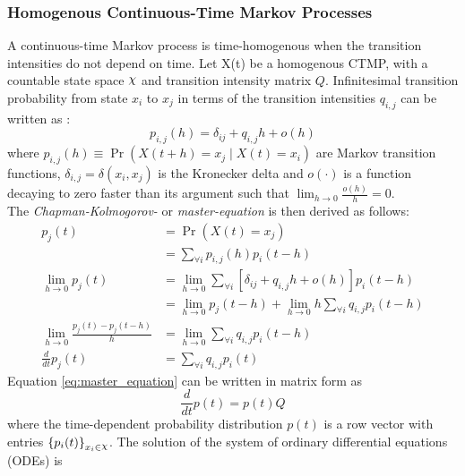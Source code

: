 \subsubsection{Homogenous Continuous-Time Markov Processes}
\label{sec:homo_CTMP}
A continuous-time Markov process is time-homogenous when the transition intensities do not depend on time. Let X(t) be a homogenous CTMP, with a countable state space $ \rchi $ and transition intensity matrix $ Q $. Infinitesimal transition probability from state $ x_{i} $ to $ x_{j} $ in terms of the transition intensities $ q_{i,j} $ can be written as \cite{Cohn2010a}:
\begin{equation}
p_{i,j}(h)=\delta_{ij}+q_{i,j} h+o(h)
\label{eq:Markov_trans_func}
\end{equation}
where $ p_{i, j}(h) \equiv \operatorname{Pr}(X(t+h)=x_j\mid X(t)=x_i) $ are Markov transition functions, $ \delta_{i,j} = \delta(x_i,x_j)$ is the Kronecker delta and $ o(\cdot) $ is a function decaying to zero faster than its argument such that $ \lim_{h \to 0} \frac{o(h)}{h} = 0 $.\\
The \textit{Chapman-Kolmogorov-} or \textit{master-equation} is then derived as follows:
\begin{align}
p_{j}(t) &= \operatorname{Pr}(X(t) = x_{j}) \nonumber\\
& =\sum_{\forall i} p_{i, j}(h) p_{i}(t-h) \nonumber \\
\lim_{h\rightarrow 0} p_{j}(t) 
& = \lim_{h\rightarrow 0} \sum_{\forall i} \left[ \delta_{ij}+q_{i,j} h+o(h)\right]  p_{i}(t-h) \nonumber \\ 
& = \lim_{h\rightarrow 0} p_{j}(t-h) + \lim_{h\rightarrow 0} h \sum_{\forall i} q_{i,j} p_{i}(t-h) \nonumber \\
\lim_{h\rightarrow 0} \frac{p_{j}(t) - p_{j}(t-h)}{h} 
&= \lim_{h\rightarrow 0} \sum_{\forall i} q_{i,j} p_{i}(t-h) \nonumber\\
\frac{d}{dt} p_{j}(t) & = \sum_{\forall i} q_{i,j} p_{i}(t)
\label{eq:master_equation}
\end{align}
Equation \ref{eq:master_equation} can be written in matrix form as
\begin{equation}
\frac{d}{dt} p(t) = p(t)Q
\end{equation}
where the time-dependent probability distribution $ p(t) $ is a row vector with entries $ \left\lbrace p_{i}(t)\right\rbrace_{x_{i}\in \rchi} $. The solution of the system of ordinary differential equations (ODEs) is
